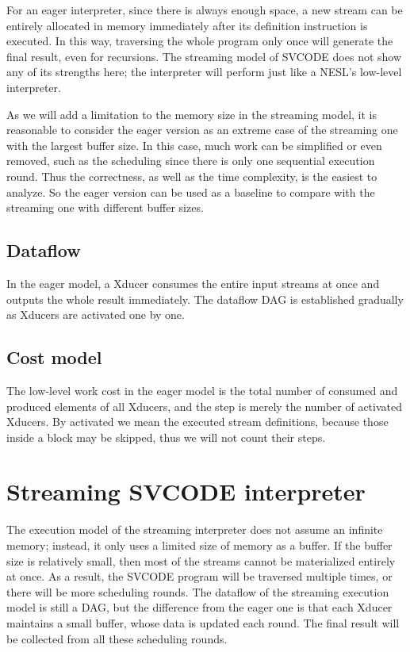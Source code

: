 For an eager interpreter, since there is always enough space, a  new stream can be entirely allocated in memory immediately after its definition instruction is executed.
In this way, traversing the whole program only once will generate the final result, even for recursions.
The streaming model of SVCODE does not show any of its strengths here; the interpreter will perform just like a NESL's low-level interpreter. 


As we will add a limitation to the memory size in the streaming model, it is reasonable to consider the eager version as an extreme case  of the streaming one with the largest buffer size. 
In this case, much work can be simplified or even removed, such as the scheduling since there is only one sequential execution round. 
Thus the correctness, as well as the time complexity, is the easiest to analyze. 
So the eager version can be used as a baseline to compare with the streaming one with different buffer sizes.


\subsection{Dataflow}
In the eager model, a Xducer consumes the entire input streams at once and outputs the whole result immediately. 
The dataflow DAG is established gradually as Xducers are activated one by one.   


\subsection{Cost model}
The low-level work cost in the eager model is the total number of consumed and produced elements of all Xducers, and the step is merely the number of activated Xducers. 
By activated we mean the executed stream definitions, because those inside a \wc block may be skipped, thus we will not count their steps. 



\section{Streaming SVCODE interpreter}

The execution model of the streaming interpreter does not assume an infinite memory; instead, it only uses a limited size of memory as a buffer. 
If the buffer size is relatively small, then most of the streams cannot be materialized entirely at once. 
As a result, the SVCODE program will be traversed multiple times, or there will be more scheduling rounds. 
The dataflow of the streaming execution model is still a DAG, but the difference from the eager one is that each Xducer maintains a small buffer, whose data is updated each round. 
The final result will be collected from all these scheduling rounds.

